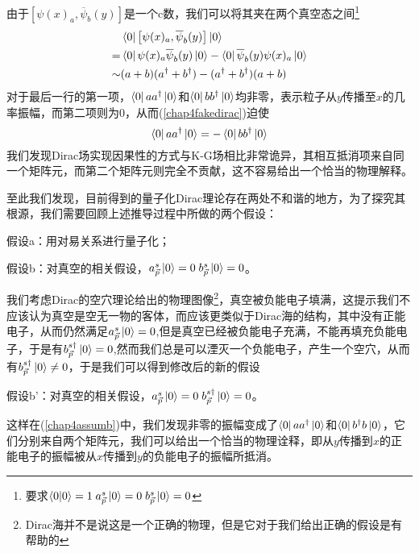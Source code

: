 由于$\left[\psi(x)_{a},\overline{\psi}_{b}(y)\right]$是一个c数，我们可以将其夹在两个真空态之间\footnote{要求$\braket{0}{0}=1\;a_{\vec{p}}^{s}\ket{0}=0\;b_{\vec{p}}^{s}\ket{0}=0$}
\begin{equation}
\label{chap4assumb}
\begin{aligned}
   & \bra{0}\left[\psi(x)_{a},\overline{\psi}_{b}(y)\right]\ket{0}\\
    =&\bra{0}\psi(x)_{a}\overline{\psi}_{b}(y)\ket{0}-\bra{0}\overline{\psi}_{b}(y)\psi(x)_{a}\ket{0}\\
    \sim & (a+b)(a^{\dagger}+b^{\dagger})-(a^{\dagger}+b^{\dagger})(a+b)
    \end{aligned}
\end{equation}
对于最后一行的第一项，$\bra{0}aa^{\dagger}\ket{0}$和$\bra{0}bb^{\dagger}\ket{0}$均非零，表示粒子从$y$传播至$x$的几率振幅，而第二项则为$0$，从而(\ref{chap4fakedirac})迫使
\begin{equation}
   \bra{0}aa^{\dagger}\ket{0}=-\bra{0}bb^{\dagger}\ket{0} 
\end{equation}
我们发现Dirac场实现因果性的方式与K-G场相比非常诡异，其相互抵消项来自同一个矩阵元，而第二个矩阵元则完全不贡献，这不容易给出一个恰当的物理解释。

至此我们发现，目前得到的量子化Dirac理论存在两处不和谐的地方，为了探究其根源，我们需要回顾上述推导过程中所做的两个假设：

假设a：用对易关系进行量子化；

假设b：对真空的相关假设，$a_{\vec{p}}^{s}\ket{0}=0\;b_{\vec{p}}^{s}\ket{0}=0$。

我们考虑Dirac的空穴理论给出的物理图像\footnote{Dirac海并不是说这是一个正确的物理，但是它对于我们给出正确的假设是有帮助的}，真空被负能电子填满，这提示我们不应该认为真空是空无一物的客体，而应该更类似于Dirac海的结构，其中没有正能电子，从而仍然满足$a_{\vec{p}}^
{s}\ket{0}=0$,但是真空已经被负能电子充满，不能再填充负能电子，于是有$b_{\vec{p}}^{s\dagger}\ket{0}=0$,然而我们总是可以湮灭一个负能电子，产生一个空穴，从而有$b_{\vec{p}}^{s\dagger}\ket{0}\neq 0$，于是我们可以得到修改后的新的假设

假设b'：对真空的相关假设，$a_{\vec{p}}^{s}\ket{0}=0\;b_{\vec{p}}^{s\dagger}\ket{0}=0$。

这样在(\ref{chap4assumb})中，我们发现非零的振幅变成了$\bra{0}aa^{\dagger}\ket{0}$和$\bra{0}b^{\dagger}b\ket{0}$，它们分别来自两个矩阵元，我们可以给出一个恰当的物理诠释，即从$y$传播到$x$的正能电子的振幅被从$x$传播到$y$的负能电子的振幅所抵消。

